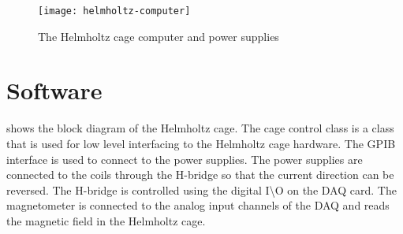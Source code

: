 \begin{figure}[!ht]
    \texttt{[image: helmholtz-computer]}
    \caption{The Helmholtz cage computer and power supplies}
    \label{fig:helmholtz-comp}
\end{figure}

\section{Software}

 shows the block diagram of the Helmholtz cage. The cage control class is a \matlab class that is used for low level interfacing to the Helmholtz cage hardware. The \ac{GPIB} interface is used to connect to the power supplies. The power supplies are connected to the coils through the H-bridge so that the current direction can be reversed. The H-bridge is controlled using the digital I\textbackslash{}O on the \ac{DAQ} card. The magnetometer is connected to the analog input channels of the \ac{DAQ} and reads the magnetic field in the Helmholtz cage. 

